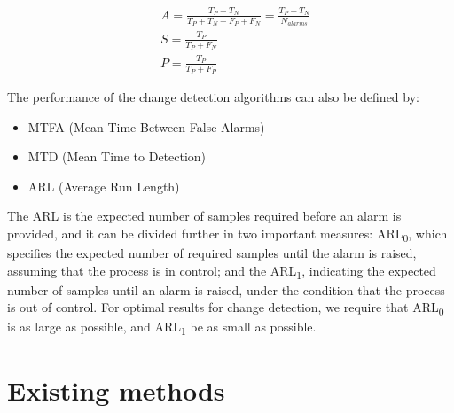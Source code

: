 \begin{equation*}
\begin{split}
    &A    =  \frac {T_P + T_N} {T_P + T_N + F_P + F_N} = \frac {T_P + T_N} {N_{alarms}}   \\
    &S    =  \frac {T_P} {T_P + F_N} \\
    &P    =  \frac {T_P} {T_P + F_P}
\end{split}
\end{equation*}

\pagebreak

The performance of the change detection algorithms can also be defined by:

\begin{itemize}
    \item MTFA (Mean Time Between False Alarms) 
    \item MTD (Mean Time to Detection)
    \item ARL (Average Run Length)
\end{itemize}


\par The ARL is the expected number of samples required before an alarm is provided, and it can be divided further in two important measures: ARL\textsubscript{0}, which specifies the expected number of required samples until the 
alarm is raised, assuming that the process is in control; and the ARL\textsubscript{1}, indicating the expected number of samples until an alarm is raised, under the condition that the process is out of control. For optimal results
for change detection, we require that ARL\textsubscript{0} is as large as possible, and ARL\textsubscript{1} be as small as possible.

\section{Existing methods}


